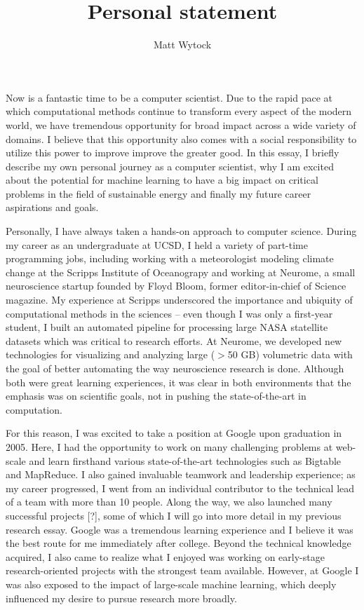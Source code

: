 \documentclass[12pt]{article}
\title{Personal statement}
\author{Matt Wytock}
\begin{document}
Now is a fantastic time to be a computer scientist. Due to the rapid pace at which computational methods continue to transform every aspect of the modern world, we have tremendous opportunity for broad impact across a wide variety of domains. I believe that this opportunity also comes with a social responsibility to utilize this power to improve improve the greater good. In this essay, I briefly describe my own personal journey as a computer scientist, why I am excited about the potential for machine learning to have a big impact on critical problems in the field of sustainable energy and finally my future career aspirations and goals.

Personally, I have always taken a hands-on approach to computer science. During my career as an undergraduate at UCSD, I held a variety of part-time programming jobs, including working with a meteorologist modeling climate change at the Scripps Institute of Oceanograpy and working at Neurome, a small neuroscience startup founded by Floyd Bloom, former editor-in-chief of Science magazine. My experience at Scripps underscored the importance and ubiquity of computational methods in the sciences -- even though I was only a first-year student, I built an automated pipeline for processing large NASA statellite datasets which was critical to research efforts. At Neurome, we developed new technologies for visualizing and analyzing large ($>$50 GB) volumetric data with the goal of better automating the way neuroscience research is done. Although both were great learning experiences, it was clear in both environments that the emphasis was on scientific goals, not in pushing the state-of-the-art in computation.

For this reason, I was excited to take a position at Google upon graduation in 2005. Here, I had the opportunity to work on many challenging problems at web-scale and learn firsthand various state-of-the-art technologies such as Bigtable and MapReduce. I also gained invaluable teamwork and leadership experience; as my career progressed, I went from an individual contributor to the technical lead of a team with more than 10 people. Along the way, we also launched many successful projects [?], some of which I will go into more detail in my previous research essay. Google was a tremendous learning experience and I believe it was the best route for me immediately after college. Beyond the technical knowledge acquired, I also came to realize what I enjoyed was working on early-stage research-oriented projects with the strongest team available. However, at Google I was also exposed to the impact of large-scale machine learning, which deeply influenced my desire to pursue research more broadly. 
\end{document}
